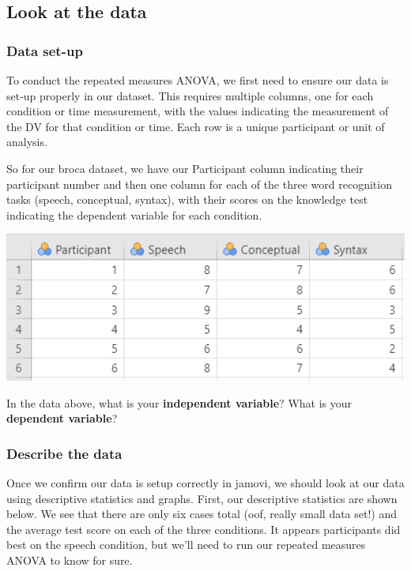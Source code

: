 \documentclass[
]{book}
\begin{document}
\hypertarget{look-at-the-data-7}{%
\subsection{Look at the data}\label{look-at-the-data-7}}

\hypertarget{data-set-up-7}{%
\subsubsection{Data set-up}\label{data-set-up-7}}

To conduct the repeated measures ANOVA, we first need to ensure our data is set-up properly in our dataset. This requires multiple columns, one for each condition or time measurement, with the values indicating the measurement of the DV for that condition or time. Each row is a unique participant or unit of analysis.

So for our broca dataset, we have our Participant column indicating their participant number and then one column for each of the three word recognition tasks (speech, conceptual, syntax), with their scores on the knowledge test indicating the dependent variable for each condition.

\includegraphics{images/05-repeated-measures-anova/rm_data.png}

In the data above, what is your \textbf{independent variable}? What is your \textbf{dependent variable}?

\hypertarget{describe-the-data-5}{%
\subsubsection{Describe the data}\label{describe-the-data-5}}

Once we confirm our data is setup correctly in jamovi, we should look at our data using descriptive statistics and graphs. First, our descriptive statistics are shown below. We see that there are only six cases total (oof, really small data set!) and the average test score on each of the three conditions. It appears participants did best on the speech condition, but we'll need to run our repeated measures ANOVA to know for sure.
\end{document}
